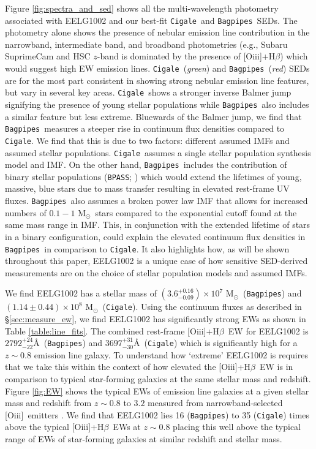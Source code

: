 \documentclass[twocolumn,tight,times,linenumbers]{aastex631}
\newcommand{\hbeta}{H$\beta$}
\newcommand{\oiii}{[O{\sc iii}]}
\newcommand{\msol}{M$_\odot$}
\newcommand{\cigale}{\texttt{Cigale}}
\newcommand{\bagpipes}{\texttt{Bagpipes}}
\begin{document}
		Figure \ref{fig:spectra_and_sed} shows all the multi-wavelength photometry associated with EELG1002 and our best-fit \cigale~and \bagpipes~SEDs. The photometry alone shows the presence of nebular emission line contribution in the narrowband, intermediate band, and broadband photometries (e.g., Subaru SuprimeCam and HSC $z$-band is dominated by the presence of \oiii+\hbeta) which would suggest high EW emission lines. \cigale~(\textit{green}) and \bagpipes~(\textit{red}) SEDs are for the most part consistent in showing strong nebular emission line features, but vary in several key areas. \cigale~shows a stronger inverse Balmer jump signifying the presence of young stellar populations while \bagpipes~also includes a similar feature but less extreme. Bluewards of the Balmer jump, we find that \bagpipes~measures a steeper rise in continuum flux densities compared to \cigale. We find that this is due to two factors: different assumed IMFs and assumed stellar populations. \cigale~assumes a single stellar population synthesis model \citep{Bruzual2003} and \cite{Chabrier2003} IMF. On the other hand, \bagpipes~includes the contribution of binary stellar populations (\texttt{BPASS}; \citealt{Stanway2018}) which would extend the lifetimes of young, massive, blue stars due to mass transfer resulting in elevated rest-frame UV fluxes. \bagpipes~also assumes a broken power law IMF that allows for increased numbers of $0.1 - 1$ \msol~stars compared to the exponential cutoff found at the same mass range in \cite{Chabrier2003} IMF. This, in conjunction with the extended lifetime of stars in a binary configuration, could explain the elevated continuum flux densities in \bagpipes~in comparison to \cigale. It also highlights how, as will be shown throughout this paper, EELG1002 is a unique case of how sensitive SED-derived measurements are on the choice of stellar population models and assumed IMFs.
		
		We find EELG1002 has a stellar mass of $(3.6^{+0.16}_{-0.09}) \times 10^7$ \msol~(\bagpipes) and $(1.14\pm0.44) \times 10^8$ \msol~(\cigale). Using the continuum fluxes as described in \S\ref{sec:measure_ew}, we find EELG1002 has significantly strong EWs as shown in Table \ref{table:line_fits}. The combined rest-frame \oiii+\hbeta~EW for EELG1002 is $2792^{+24}_{-22}$\AA~(\bagpipes) and $3697^{+31}_{-30}$\AA~(\cigale) which is significantly high for a $z \sim 0.8$ emission line galaxy. To understand how `extreme' EELG1002 is requires that we take this within the context of how elevated the \oiii+\hbeta~EW is in comparison to typical star-forming galaxies at the same stellar mass and redshift. Figure \ref{fig:EW} shows the typical EWs of emission line galaxies at a given stellar mass and redshift from $z \sim 0.8$ to $3.2$ measured from narrowband-selected \oiii~emitters \citep{Khostovan2016}. We find that EELG1002 lies 16 (\bagpipes) to 35 (\cigale) times above the typical \oiii+\hbeta~EWs at $z \sim 0.8$ placing this well above the typical range of EWs of star-forming galaxies at similar redshift and stellar mass.
		
\end{document}
